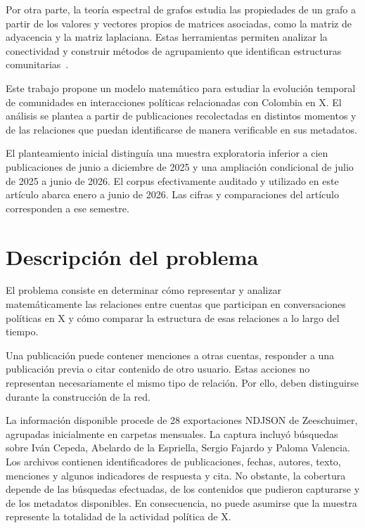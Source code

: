 \documentclass[journal]{IEEEtran}
\begin{document}
Por otra parte, la teoría espectral de grafos estudia las propiedades de un grafo a partir de los valores y vectores propios de matrices asociadas, como la matriz de adyacencia y la matriz laplaciana. Estas herramientas permiten analizar la conectividad y construir métodos de agrupamiento que identifican estructuras comunitarias~\cite{chung,luxburg}.

Este trabajo propone un modelo matemático para estudiar la evolución temporal de comunidades en interacciones políticas relacionadas con Colombia en X. El análisis se plantea a partir de publicaciones recolectadas en distintos momentos y de las relaciones que puedan identificarse de manera verificable en sus metadatos.

El planteamiento inicial distinguía una muestra exploratoria inferior a cien publicaciones de junio a diciembre de 2025 y una ampliación condicional de julio de 2025 a junio de 2026. El corpus efectivamente auditado y utilizado en este artículo abarca enero a junio de 2026. Las cifras y comparaciones del artículo corresponden a ese semestre.

\section{Descripción del problema}
El problema consiste en determinar cómo representar y analizar matemáticamente las relaciones entre cuentas que participan en conversaciones políticas en X y cómo comparar la estructura de esas relaciones a lo largo del tiempo.

Una publicación puede contener menciones a otras cuentas, responder a una publicación previa o citar contenido de otro usuario. Estas acciones no representan necesariamente el mismo tipo de relación. Por ello, deben distinguirse durante la construcción de la red.

La información disponible procede de 28 exportaciones NDJSON de Zeeschuimer, agrupadas inicialmente en carpetas mensuales. La captura incluyó búsquedas sobre Iván Cepeda, Abelardo de la Espriella, Sergio Fajardo y Paloma Valencia. Los archivos contienen identificadores de publicaciones, fechas, autores, texto, menciones y algunos indicadores de respuesta y cita. No obstante, la cobertura depende de las búsquedas efectuadas, de los contenidos que pudieron capturarse y de los metadatos disponibles. En consecuencia, no puede asumirse que la muestra represente la totalidad de la actividad política de X.
\end{document}
